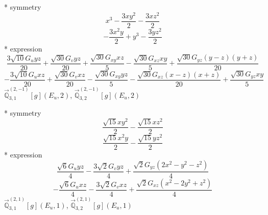 \documentclass[fleqn,8pt]{jsarticle}
\begin{document}
\noindent\quad ** symmetry
\begin{dmath*}
x^{3} - \frac{3 x y^{2}}{2} - \frac{3 x z^{2}}{2}
\end{dmath*}
\begin{dmath*}
- \frac{3 x^{2} y}{2} + y^{3} - \frac{3 y z^{2}}{2}
\end{dmath*}
\noindent\quad ** expression
\begin{dmath*}
\frac{3 \sqrt{10} G_{u} y z}{20} + \frac{\sqrt{30} G_{v} y z}{20} + \frac{\sqrt{30} G_{xy} x z}{5} - \frac{\sqrt{30} G_{xz} x y}{5} + \frac{\sqrt{30} G_{yz} \left(y - z\right) \left(y + z\right)}{20}
\end{dmath*}
\begin{dmath*}
- \frac{3 \sqrt{10} G_{u} x z}{20} + \frac{\sqrt{30} G_{v} x z}{20} - \frac{\sqrt{30} G_{xy} y z}{5} - \frac{\sqrt{30} G_{xz} \left(x - z\right) \left(x + z\right)}{20} + \frac{\sqrt{30} G_{yz} x y}{5}
\end{dmath*}
\noindent\quad $\vec{\mathbb{Q}}_{3,1}^{(2,-1)}[g](E_{u},2)$, $\vec{\mathbb{Q}}_{3,2}^{(2,-1)}[g](E_{u},2)$

\noindent\quad ** symmetry
\begin{dmath*}
\frac{\sqrt{15} x y^{2}}{2} - \frac{\sqrt{15} x z^{2}}{2}
\end{dmath*}
\begin{dmath*}
\frac{\sqrt{15} x^{2} y}{2} - \frac{\sqrt{15} y z^{2}}{2}
\end{dmath*}
\noindent\quad ** expression
\begin{dmath*}
\frac{\sqrt{6} G_{u} y z}{4} - \frac{3 \sqrt{2} G_{v} y z}{4} + \frac{\sqrt{2} G_{yz} \left(2 x^{2} - y^{2} - z^{2}\right)}{4}
\end{dmath*}
\begin{dmath*}
- \frac{\sqrt{6} G_{u} x z}{4} - \frac{3 \sqrt{2} G_{v} x z}{4} + \frac{\sqrt{2} G_{xz} \left(x^{2} - 2 y^{2} + z^{2}\right)}{4}
\end{dmath*}
\noindent\quad $\vec{\mathbb{Q}}_{3,1}^{(2,1)}[g](E_{u},1)$, $\vec{\mathbb{Q}}_{3,2}^{(2,1)}[g](E_{u},1)$
\end{document}

